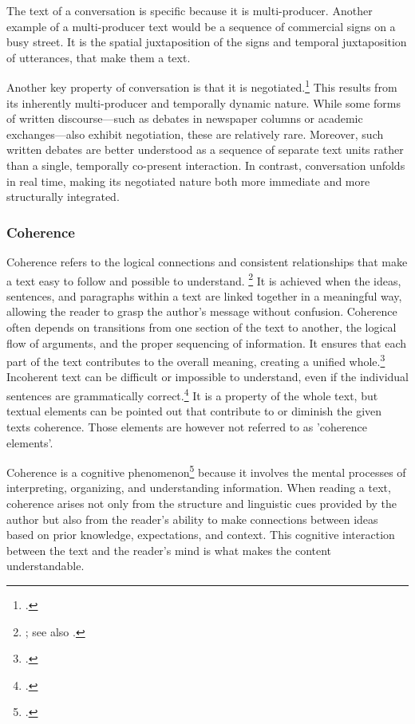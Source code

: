 \documentclass[12pt]{report}
\begin{document}
{\par
    The text of a conversation is specific because it is multi-producer.
    Another example of a multi-producer text
    would be a sequence of commercial signs on a busy street.
    It is the spatial juxtaposition of the signs and temporal juxtaposition of utterances,
    that make them a text.

    \par
    Another key property of conversation is that it is negotiated.\footcite{Sacks1992}
    This results from its inherently multi-producer and temporally dynamic nature.
    While some forms of written discourse—such as debates in newspaper columns or academic exchanges—also exhibit negotiation,
    these are relatively rare.
    Moreover, such written debates are better understood as a sequence of separate text units rather than a single, temporally co-present interaction.
    In contrast, conversation unfolds in real time, making its negotiated nature both more immediate and more structurally integrated.

\subsubsection{Coherence}
\par
    Coherence refers to the logical connections and consistent relationships that
    make a text easy to follow and possible to understand. \footnote{\cite[p.~83]{givón2020coherence}; see also \cite[p.~9]{hrbacek1994}.}
    It is achieved when the ideas, sentences, and paragraphs within a text are linked together in a meaningful way,
    allowing the reader to grasp the author's message without confusion.
    Coherence often depends on transitions from one section of the text to another,
    the logical flow of arguments, and the proper sequencing of information.
    It ensures that each part of the text contributes to the overall meaning, creating a unified whole.\footcite[p.~28]{hrbacek1994}
    Incoherent text can be difficult or impossible to understand, even if the individual sentences are grammatically correct.\footcite[p.~30]{hrbacek1994}
    It is a property of the whole text, but
    textual elements can be pointed out that contribute to or diminish the given texts coherence.
    Those elements are however not referred to as 'coherence elements'.

\par
    Coherence is a cognitive phenomenon\footcite{Roberts01101993} because
    it involves the mental processes of interpreting, organizing, and understanding information.
    When reading a text,
    coherence arises not only from the structure and linguistic cues provided by the author but
    also from the reader's ability to
    make connections between ideas based on prior knowledge, expectations, and context.
    This cognitive interaction between the text and the reader’s mind is what makes the content understandable.

}
\end{document}
